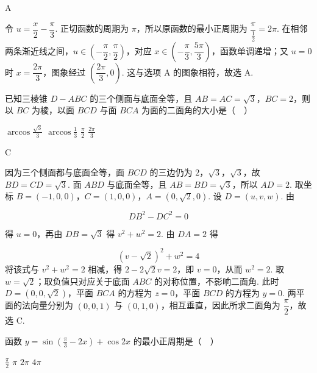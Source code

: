 \begin{answer}
A
\end{answer}

\begin{solution}
令 \(u=\dfrac{x}{2}-\dfrac{\pi}{3}\). 正切函数的周期为 \(\pi\)，所以原函数的最小正周期为 \(\dfrac{\pi}{\frac{1}{2}}=2\pi\). 在相邻两条渐近线之间，\(u\in\left(-\dfrac{\pi}{2},\dfrac{\pi}{2}\right)\)，对应 \(x\in\left(-\dfrac{\pi}{3},\dfrac{5\pi}{3}\right)\)，函数单调递增；又 \(u=0\) 时 \(x=\dfrac{2\pi}{3}\)，图象经过 \(\left(\dfrac{2\pi}{3},0\right)\). 这与选项 A 的图象相符，故选 A.
\end{solution}

\begin{problem}
已知三棱锥 \(D - ABC\) 的三个侧面与底面全等，且 \(AB = AC = \sqrt{3}\)，\(BC = 2\)，则以 \(BC\) 为棱，以面 \(BCD\) 与面 \(BCA\) 为面的二面角的大小是（\(\quad\)）

\choices
    {\(\arccos \frac{\sqrt{3}}{3}\)}
    {\(\arccos \frac{1}{3}\)}
    {\(\frac{\pi}{2}\)}
    {\(\frac{2\pi}{3}\)}
\end{problem}

\begin{answer}
C
\end{answer}

\begin{solution}
因为三个侧面都与底面全等，面 \(BCD\) 的三边仍为 \(2\)，\(\sqrt{3}\)，\(\sqrt{3}\)，故 \(BD=CD=\sqrt{3}\). 面 \(ABD\) 与底面全等，且 \(AB=BD=\sqrt{3}\)，所以 \(AD=2\). 取坐标 \(B=(-1,0,0)\)，\(C=(1,0,0)\)，\(A=(0,\sqrt{2},0)\). 设 \(D=(u,v,w)\). 由

\[
DB^{2}-DC^{2}=0
\]

得 \(u=0\)，再由 \(DB=\sqrt{3}\) 得 \(v^{2}+w^{2}=2\). 由 \(DA=2\) 得

\[
(v-\sqrt{2})^{2}+w^{2}=4
\]
将该式与 \(v^{2}+w^{2}=2\) 相减，得 \(2-2\sqrt{2}v=2\)，即 \(v=0\)，从而 \(w^{2}=2\). 取 \(w=\sqrt{2}\)；取负值只对应关于底面 \(ABC\) 的对称位置，不影响二面角. 此时 \(D=(0,0,\sqrt{2})\)，平面 \(BCA\) 的方程为 \(z=0\)，平面 \(BCD\) 的方程为 \(y=0\). 两平面的法向量分别为 \((0,0,1)\) 与 \((0,1,0)\)，相互垂直，因此所求二面角为 \(\dfrac{\pi}{2}\)，故选 C.
\end{solution}

\begin{problem}
函数 \(y = \sin \left(\frac{\pi}{3} - 2x\right) + \cos 2x\) 的最小正周期是（\(\quad\)）

\choices
    {\(\frac{\pi}{2}\)}
    {\(\pi\)}
    {\(2\pi\)}
    {\(4\pi\)}
\end{problem}

